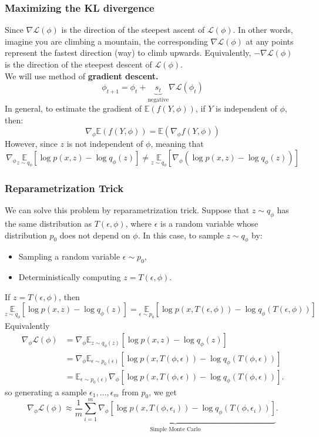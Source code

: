 \subsubsection{Maximizing the KL divergence}
Since $\nabla \mathcal{L}(\phi)$ is the direction of the steepest ascent of $\mathcal{L}(\phi)$. In other words, imagine you are climbing a mountain, the corresponding $\nabla \mathcal{L}(\phi)$ at any points represent the fastest direction (way) to climb upwards. Equivalently, $-\nabla \mathcal{L}(\phi)$ is the direction of the steepest descent of $\mathcal{L}(\phi)$.\\

We will use method of \textbf{gradient descent.}
$$\phi_{t+1}=\phi_t+\underbrace{s_t}_{\text{negative}} \nabla \mathcal{L}\left(\phi_t\right)$$
In general, to estimate the gradient of $\mathbb{E}(f(Y, \phi))$, if $Y$ is independent of $\phi$, then:
$$\nabla_\phi \mathbb{E}(f(Y, \phi))=\mathbb{E}\left(\nabla_\phi f(Y, \phi)\right)$$
However, since $z$ is not independent of $\phi$, meaning that
$$\nabla_{\phi} \underset{z \sim q_\phi}{\mathbb{E}}\left[\log p(x, z)-\log q_\phi(z)\right] \neq \underset{z \sim q_\phi}{\mathbb{E}}\left[\nabla_\phi\left(\log p(x, z)-\log q_\phi(z)\right)\right]$$
\subsubsection*{Reparametrization Trick}
We can solve this problem by reparametrization trick. Suppose that $z \sim q_\phi$ has the same distribution as $T(\epsilon, \phi)$, where $\epsilon$ is a random variable whose distribution $p_0$ does not depend on $\phi$. In this case, to sample $z \sim q_\phi$ by:
\begin{itemize}
\item Sampling a random variable $\epsilon \sim p_0$,
\item Deterministically computing $z=T(\epsilon, \phi)$.
\end{itemize}
If $z=T(\epsilon, \phi)$, then
$$
\underset{z \sim q_\phi}{\mathbb{E}}\left[\log p(x, z)-\log q_\phi(z)\right]=\underset{\epsilon \sim p_0}{\mathbb{E}}\left[\log p(x, T(\epsilon, \phi))-\log q_\phi(T(\epsilon, \phi))\right]
$$
Equivalently
$$
\begin{aligned}
\nabla_\phi \mathcal{L}(\phi) & =\nabla_\phi \mathbb{E}_{z \sim q_\phi(z)}\left[\log p(x, z)-\log q_\phi(z)\right] \\
& =\nabla_\phi \mathbb{E}_{\epsilon \sim p_0(\epsilon)}\left[\log p(x, T(\phi, \epsilon))-\log q_\phi(T(\phi, \epsilon))\right] \\
& =\mathbb{E}_{\epsilon \sim p_0(\epsilon)} \nabla_\phi\left[\log p(x, T(\phi, \epsilon))-\log q_\phi(T(\phi, \epsilon))\right] .
\end{aligned}
$$
so generating a sample $\epsilon_1, \ldots, \epsilon_m$ from $p_0$, we get
$$
\nabla_\phi \mathcal{L}(\phi) \approx \underbrace{\frac{1}{m} \sum_{i=1}^m \nabla_\phi\left[\log p\left(x, T\left(\phi, \epsilon_i\right)\right)-\log q_\phi\left(T\left(\phi, \epsilon_i\right)\right)\right]}_{\text{Simple Monte Carlo}}.
$$

